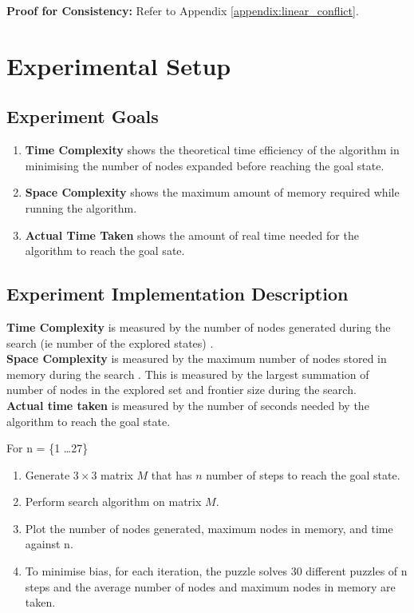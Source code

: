 \documentclass[runningheads]{llncs}
\begin{document}
\textbf{Proof for Consistency:} Refer to Appendix \ref{appendix:linear_conflict}.

\section{Experimental Setup}
\subsection{Experiment Goals}
\begin{enumerate}
    \item \textbf{Time Complexity} shows the theoretical time efficiency of the algorithm in minimising the number of nodes expanded before reaching the goal state.
    \item \textbf{Space Complexity} shows the maximum amount of memory required while running the algorithm.
    \item \textbf{Actual Time Taken} shows the amount of real time needed for the algorithm to reach the goal sate.
\end{enumerate}

\subsection{Experiment Implementation Description}
\textbf{Time Complexity} is measured by the number of nodes generated during the search (ie number of the explored states) \cite[p80]{stuart_russell_artifical_2010}. \\
\textbf{Space Complexity} is measured by the maximum number of nodes stored in memory during the search \cite[p80]{stuart_russell_artifical_2010}. This is measured by the largest summation of number of nodes in the explored set and frontier size during the search. \\
\textbf{Actual time taken} is measured by the number of seconds needed by the algorithm to reach the goal state.

For n = \{1 \dots 27\}
\begin{enumerate}
    \item Generate \(3 \times 3 \) matrix \( M \) that has \( n \) number of steps to reach the goal state.
    \item Perform search algorithm on matrix \( M \).
    \item Plot the number of nodes generated, maximum nodes in memory, and time against n. %
    \item To minimise bias, for each iteration, the puzzle solves 30 different puzzles of n steps and the average number of nodes and maximum nodes in memory are taken.
\end{enumerate}
\end{document}
